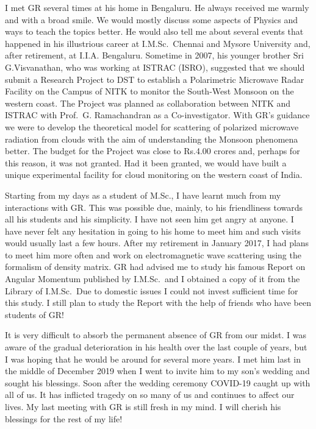 I met GR several times at his home in Bengaluru. He always received me warmly and with a broad smile. We would mostly discuss some aspects of Physics and ways to teach the topics better. He would also tell me about several events that happened in his illustrious career at I.M.Sc.\ Chennai and Mysore University and, after retirement, at I.I.A. Bengaluru. Sometime in 2007, his younger brother Sri G.Visvanathan, who was working at ISTRAC (ISRO), suggested that we should submit a Research Project to DST to establish a Polarimetric Microwave Radar Facility on the Campus of NITK to monitor the South-West Monsoon on the western coast. The Project was planned as collaboration between NITK and ISTRAC with Prof.\ G. Ramachandran as a Co-investigator. With GR's guidance we were to develop the theoretical model for scattering of polarized microwave radiation from clouds with the aim of understanding the Monsoon phenomena better. The budget for the Project was close to Rs.4.00 crores and, perhaps for this reason, it was not granted. Had it been granted, we would have built a unique experimental facility for cloud monitoring on the western coast of India.

Starting from my days as a student of M.Sc., I have learnt much from my interactions with GR. This was possible due, mainly, to his friendliness towards all his students and his simplicity. I have not seen him get angry at anyone. I have never felt any hesitation in going to his home to meet him and such visits would usually last a few hours. After my retirement in January 2017, I had plans to meet him more often and work on electromagnetic wave scattering using the formalism of density matrix. GR had advised me to study his famous Report on Angular Momentum published by I.M.Sc.\ and I obtained a copy of it from the Library of I.M.Sc.\ Due to domestic issues I could not invest sufficient time for this study. I still plan to study the Report with the help of friends who have been students of GR!

It is very difficult to absorb the permanent absence of GR from our midst. I was aware of the gradual deterioration in his health over the last couple of years, but I was hoping that he would be around for several more years. I met him last in the middle of December 2019 when I went to invite him to my son's wedding and sought his blessings. Soon after the wedding ceremony COVID-19 caught up with all of us. It has inflicted tragedy on so many of us and continues to affect our lives. My last meeting with GR is still fresh in my mind. I will cherish his blessings for the rest of my life!
\vskip 1cm

